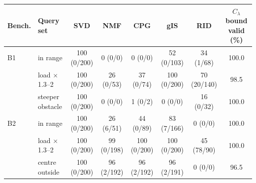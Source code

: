 \begin{tabular}{@{}llcccccc@{}}
\toprule
Bench. & Query set & SVD & NMF & CPG & gIS & RID & $C_\lambda$ bound valid (\%) \\
\midrule
B1 & in range & 100 (0/200) & 0 (0/0) & 0 (0/0) & 52 (0/103) & 34 (1/68) & 100.0 \\
 & load $\times$1.3--2 & 100 (0/200) & 26 (0/53) & 37 (0/74) & 100 (0/200) & 70 (20/140) & 98.5 \\
 & steeper obstacle & 100 (0/200) & 0 (0/0) & 1 (0/2) & 0 (0/0) & 16 (0/32) & 100.0 \\
\midrule
B2 & in range & 100 (0/200) & 26 (6/51) & 44 (0/89) & 83 (7/166) & 0 (0/0) & 100.0 \\
 & load $\times$1.3--2 & 100 (0/200) & 99 (0/198) & 100 (0/200) & 100 (0/200) & 45 (78/90) & 100.0 \\
 & centre outside & 100 (0/200) & 96 (2/192) & 96 (2/192) & 96 (2/191) & 0 (0/0) & 96.5 \\
\bottomrule
\end{tabular}

